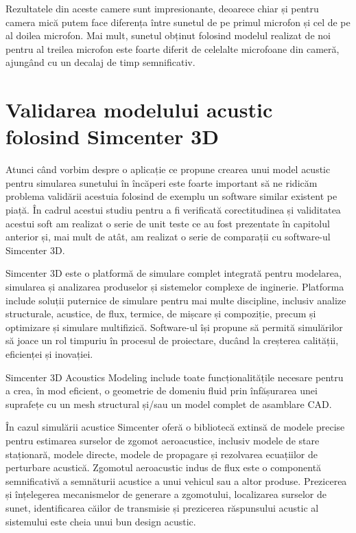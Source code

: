 	Rezultatele din aceste camere sunt impresionante, deoarece chiar și pentru camera mică putem face diferența între sunetul de pe primul microfon și cel de pe al doilea microfon. Mai mult, sunetul obținut folosind modelul realizat de noi pentru al treilea microfon este foarte diferit de celelalte microfoane din cameră, ajungând cu un decalaj de timp semnificativ.


\section{Validarea modelului acustic folosind Simcenter 3D}

	Atunci când vorbim despre o aplicație ce propune crearea unui model acustic pentru simularea sunetului în încăperi este foarte important să ne ridicăm problema validării acestuia folosind de exemplu un software similar existent pe piață. În cadrul acestui studiu pentru a fi verificată corectitudinea și validitatea acestui soft am realizat o serie de unit teste ce au fost prezentate în capitolul anterior și, mai mult de atât, am realizat o serie de comparații cu software-ul Simcenter 3D.
	
	Simcenter 3D este o platformă de simulare complet integrată pentru modelarea, simularea și analizarea produselor și sistemelor complexe de inginerie. Platforma include soluții puternice de simulare pentru mai multe discipline, inclusiv analize structurale, acustice, de flux, termice, de mișcare și compoziție, precum și optimizare și simulare multifizică. Software-ul își propune să permită simulărilor să joace un rol timpuriu în procesul de proiectare, ducând la creșterea calității, eficienței și inovației.
	
	Simcenter 3D Acoustics Modeling include toate funcționalitățile necesare pentru a crea, în mod eficient, o geometrie de domeniu fluid prin înfășurarea unei suprafețe cu un mesh structural și/sau un model complet de asamblare CAD.
	
	În cazul simulării acustice Simcenter oferă o bibliotecă extinsă de modele precise pentru estimarea surselor de zgomot aeroacustice, inclusiv modele de stare staționară, modele directe, modele de propagare și rezolvarea ecuațiilor de perturbare acustică. Zgomotul aeroacustic indus de flux este o componentă semnificativă a semnăturii acustice a unui vehicul sau a altor produse. Prezicerea și înțelegerea mecanismelor de generare a zgomotului, localizarea surselor de sunet, identificarea căilor de transmisie și prezicerea răspunsului acustic al sistemului este cheia unui bun design acustic.
	
